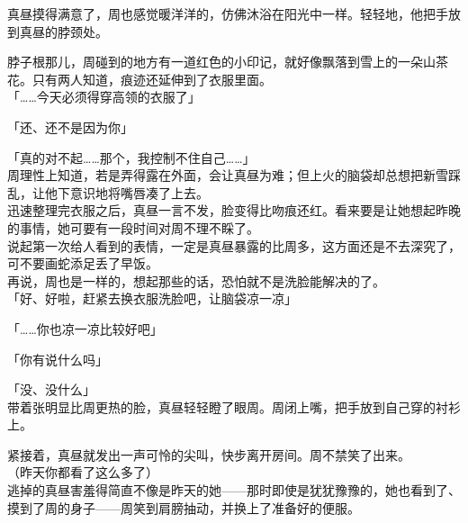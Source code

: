 真昼摸得满意了，周也感觉暖洋洋的，仿佛沐浴在阳光中一样。轻轻地，他把手放到真昼的脖颈处。

脖子根那儿，周碰到的地方有一道红色的小印记，就好像飘落到雪上的一朵山茶花。只有两人知道，痕迹还延伸到了衣服里面。\\

「……今天必须得穿高领的衣服了」

「还、还不是因为你」

「真的对不起……那个，我控制不住自己……」\\

周理性上知道，若是弄得露在外面，会让真昼为难；但上火的脑袋却总想把新雪踩乱，让他下意识地将嘴唇凑了上去。\\

迅速整理完衣服之后，真昼一言不发，脸变得比吻痕还红。看来要是让她想起昨晚的事情，她可要有一段时间对周不理不睬了。\\

说起第一次给人看到的表情，一定是真昼暴露的比周多，这方面还是不去深究了，可不要画蛇添足丢了早饭。\\

再说，周也是一样的，想起那些的话，恐怕就不是洗脸能解决的了。\\

「好、好啦，赶紧去换衣服洗脸吧，让脑袋凉一凉」

「……你也凉一凉比较好吧」

「你有说什么吗」

「没、没什么」\\

带着张明显比周更热的脸，真昼轻轻瞪了眼周。周闭上嘴，把手放到自己穿的衬衫上。

紧接着，真昼就发出一声可怜的尖叫，快步离开房间。周不禁笑了出来。\\

（昨天你都看了这么多了）\\

逃掉的真昼害羞得简直不像是昨天的她——那时即使是犹犹豫豫的，她也看到了、摸到了周的身子——周笑到肩膀抽动，并换上了准备好的便服。
